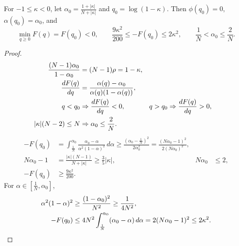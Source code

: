 \begin{lemma}
\label{lem:barrier}
For $-1\le \kappa<0$, let $\alpha_0=\tfrac{1+|\kappa|}{N+|\kappa|}$ and $q_0=\log(1-\kappa)$.
Then $\phi(q_0)=0$, $\alpha(q_0)=\alpha_0$, and
\begin{equation}
 \min_{q\ge0}F(q)=F(q_0)<0,\qquad
 \frac{9\kappa^2}{200}\le -F(q_0)\le2\kappa^2,\qquad
 \frac{1}{N}<\alpha_0\le\frac{2}{N}.
 \label{eq:barrier-bounds}
\end{equation}
\end{lemma}
\begin{proof}
\begin{align*}
 \frac{(N-1)\alpha_0}{1-\alpha_0}&=(N-1)\rho=1-\kappa,\\
 \frac{d F(q)}{d q}&=\frac{\alpha(q)-\alpha_0}{\alpha(q)(1-\alpha(q))},\\
 q<q_0&\Rightarrow \frac{d F(q)}{d q}<0,&q>q_0&\Rightarrow \frac{d F(q)}{d q}>0,\\
 |\kappa|(N-2)\le N&\Rightarrow \alpha_0\le\frac{2}{N}.
\end{align*}
\begin{align*}
 -F(q_0)
 &=\int_{\frac{1}{N}}^{\alpha_0}\frac{\alpha_0-\alpha}{\alpha^2(1-\alpha)^2}\,d\alpha
 \ge\frac{(\alpha_0-\frac{1}{N})^2}{2\alpha_0^2}
 =\frac{(N \alpha_0-1)^2}{2(N \alpha_0)^2},\\
 N \alpha_0-1&=\frac{|\kappa|(N-1)}{N+|\kappa|}\ge\frac{3}{5}|\kappa|,&N \alpha_0&\le2,\\
 -F(q_0)&\ge\frac{9\kappa^2}{200}.
\end{align*}
For $\alpha\in[\tfrac{1}{N},\alpha_0]$,
\begin{align*}
 \alpha^2(1-\alpha)^2&\ge\frac{(1-\alpha_0)^2}{N^2}\ge\frac{1}{4N^2},\\
 -F(q_0)&\le4N^2\int_{\frac{1}{N}}^{\alpha_0}(\alpha_0-\alpha)\,d\alpha
 =2(N \alpha_0-1)^2\le2\kappa^2.\qedhere
\end{align*}
\end{proof}

